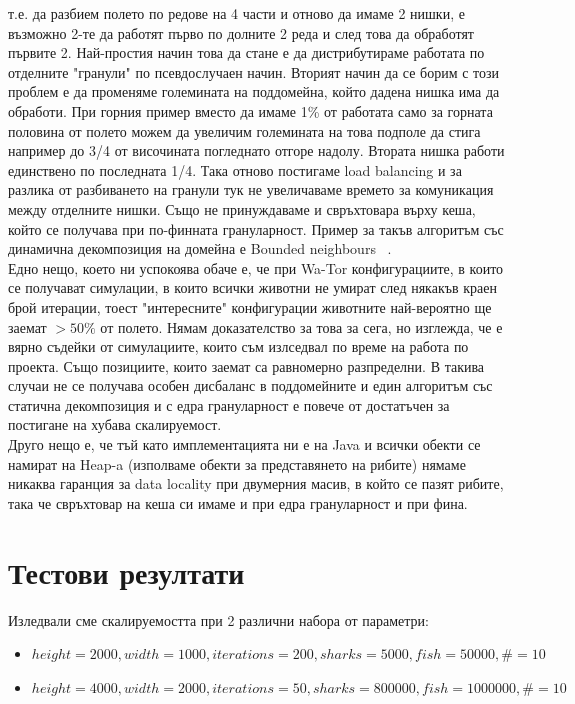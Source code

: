 \documentclass[12pt]{article}
\begin{document}
т.е. да разбием полето по редове на 4 части и отново да имаме 2 нишки, е възможно 2-те да работят първо по долните 2
реда и след това да обработят първите 2. Най-простия начин това да стане е да дистрибутираме
работата по отделните "гранули" по псевдослучаен начин. Вторият начин да се борим с този проблем е да променяме големината
на поддомейна, който дадена нишка има да обработи. При горния пример вместо да имаме 1\% от работата само за
горната половина от полето можем да увеличим големината на това подполе да стига например до 3/4 от височината погледнато
отгоре надолу. Втората нишка работи единствено по последната 1/4. Така отново постигаме load balancing и за разлика
от разбиването на гранули тук не увеличаваме времето за комуникация между отделните нишки. Също не принуждаваме
и свръхтовара върху кеша, който се получава при по-финната грануларност. Пример за такъв алгоритъм със динамична
декомпозиция на домейна е Bounded neighbours ~\cite{bounded_neighbours}.
\\
Едно нещо, което ни успокоява обаче е, че при Wa-Tor конфигурациите, в които се получават симулации, в които всички животни
не умират след някакъв краен брой итерации, тоест "интересните" конфигурации животните най-вероятно ще заемат $> 50\%$ от полето.
Нямам доказателство за това за сега, но изглежда, че е вярно съдейки от симулациите, които съм излседвал по време на работа
по проекта. Също позициите, които заемат са равномерно разпределни. В такива случаи не се получава особен дисбаланс в поддомейните
и един алгоритъм със статична декомпозиция и с едра грануларност е повече от достатъчен за постигане на хубава скалируемост.
\\
Друго нещо е, че тъй като имплементацията ни е на Java и всички обекти се намират на Heap-a (изполваме обекти за представянето
на рибите) нямаме никаква гаранция за data locality при двумерния масив, в който се пазят рибите, така че свръхтовар
на кеша си имаме и при едра грануларност и при фина.

\section{Тестови резултати}

\bigbreak
Изледвали сме скалируемостта при 2 различни набора от параметри:
\begin{itemize}
	\item $height = 2000, width = 1000, iterations = 200, sharks = 5000, fish = 50 000, \# = 10$
	\item $height = 4000, width = 2000, iterations = 50, sharks = 800 000, fish = 1 000 000, \# = 10$
\end{itemize}
\end{document}
